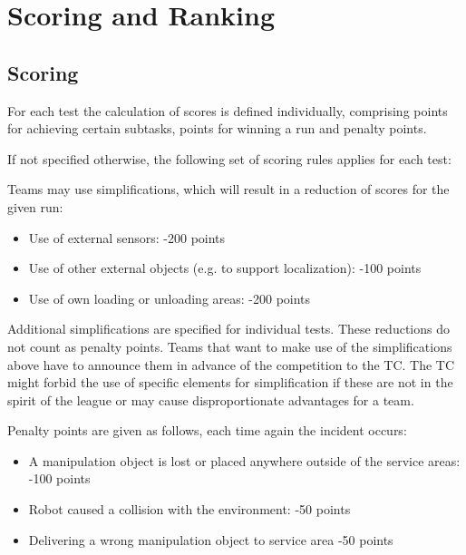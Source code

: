 

\newpage

\section{Scoring and Ranking} \label{sec:ScoringAndRanking}


\subsection{Scoring} \label{ssec:ScoringAndRanking}
For each test the calculation of scores is defined individually, comprising points for achieving certain subtasks, points for winning a run and penalty points.
\par
If not specified otherwise, the following set of scoring rules applies for each test:
\par
Teams may use simplifications, which will result in a reduction of scores for the given run:

\begin{itemize}
	\item Use of external sensors: \hfill -200 points
	\item Use of other external objects (e.g. to support localization): \hfill -100 points
	\item Use of own loading or unloading areas: \hfill -200 points
\end{itemize}

Additional simplifications are specified for individual tests. These reductions do not count as penalty points. Teams that want to make use of the simplifications above have to announce them in advance of the competition to the TC. The TC might forbid the use of specific elements for simplification if these are not in the spirit of the league or may cause disproportionate advantages for a team.
\par
Penalty points are given as follows, each time again the incident occurs:

\begin{itemize}
	\item A manipulation object is lost or placed anywhere outside of the service areas: \hfill -100 points
	\item Robot caused a collision with the environment: \hfill -50 points
	\item Delivering a wrong manipulation object to service area \hfill -50 points 
\end{itemize}

